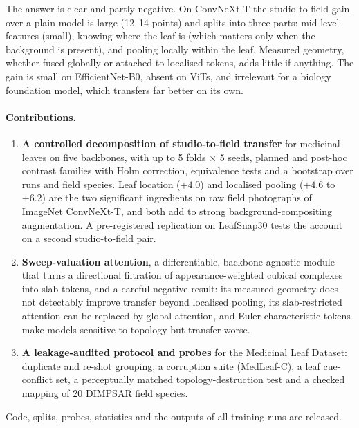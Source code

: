 The answer is clear and partly negative. On ConvNeXt-T the studio-to-field gain over a plain model is
large (12--14 points) and splits into three parts: mid-level features (small), knowing where the leaf
is (which matters only when the background is present), and pooling locally within the leaf. Measured
geometry, whether fused globally or attached to localised tokens, adds little if anything. The gain is
small on EfficientNet-B0, absent on ViTs, and irrelevant for a biology foundation model, which
transfers far better on its own.

\paragraph{Contributions.}
\begin{enumerate}
\item \textbf{A controlled decomposition of studio-to-field transfer} for medicinal leaves on five
  backbones, with up to 5 folds $\times$ 5 seeds, planned and post-hoc contrast families with Holm
  correction, equivalence tests and a bootstrap over runs and field species. Leaf location ($+4.0$) and
  localised pooling ($+4.6$ to $+6.2$) are the two significant ingredients on raw field photographs of
  ImageNet ConvNeXt-T, and both add to strong background-compositing augmentation. A
  pre-registered replication on LeafSnap30 tests the account on a second studio-to-field pair.
\item \textbf{Sweep-valuation attention}, a differentiable, backbone-agnostic module that turns a
  directional filtration of appearance-weighted cubical complexes into slab tokens, and a careful
  negative result: its measured geometry does not detectably improve transfer beyond localised pooling,
  its slab-restricted attention can be replaced by global attention, and Euler-characteristic tokens
  make models sensitive to topology but transfer worse.
\item \textbf{A leakage-audited protocol and probes} for the Medicinal Leaf Dataset: duplicate and
  re-shot grouping, a corruption suite (MedLeaf-C), a leaf cue-conflict set, a perceptually matched
  topology-destruction test and a checked mapping of 20 DIMPSAR field species.
\end{enumerate}
Code, splits, probes, statistics and the outputs of all training runs are released.